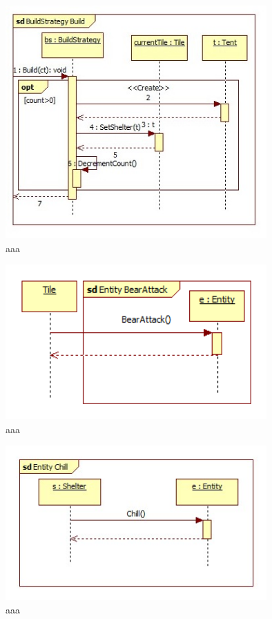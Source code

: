 \begin{figure}[H]
        \begin{center}
                \includegraphics[width=10cm]{chapters/chapter07/seqdiag/BuildStrategy_Build.jpg}
                \caption{aaa}
                \label{bbb}
        \end{center}
\end{figure}
\begin{figure}[H]
        \begin{center}
                \includegraphics[width=10cm]{chapters/chapter07/seqdiag/Entity_BearAttack.png}
                \caption{aaa}
                \label{bbb}
        \end{center}
\end{figure}
\begin{figure}[H]
        \begin{center}
                \includegraphics[width=10cm]{chapters/chapter07/seqdiag/Entity_Chill.jpg}
                \caption{aaa}
                \label{bbb}
        \end{center}
\end{figure}
